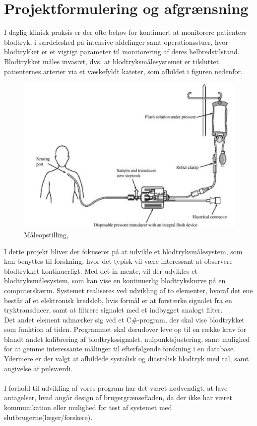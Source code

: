 \chapter{Projektformulering og afgrænsning}
I daglig klinisk praksis er der ofte behov for kontinuert at monitorere patienters blodtryk, i særdeleshed på intensive afdelinger samt operationsstuer, hvor blodtrykket er et vigtigt parameter til monitorering af deres helbredstilstand. \\
Blodtrykket måles invasivt, dvs. at blodtryksmålesystemet er tilsluttet patienternes arterier via et væskefyldt kateter, som afbildet i figuren nedenfor.
\begin{figure}[H]
	\centering
	\includegraphics[width=1\textwidth]{Figurer/Snip20151207_50}
	\caption{Måleopstilling, \protect\cite[s. 296]{Billed for invasiv blodtryksmaling}}
\end{figure}

I dette projekt bliver der fokuseret på at udvikle et blodtryksmålesystem, som kan benyttes til forskning, hvor det typisk vil være interessant at observere blodtrykket kontinuerligt. 
Med det in mente, vil der udvikles et blodtryksmålesystem, som kan vise en kontinuerlig blodtrykskurve på en computerskærm.
Systemet realiseres ved udvikling af to elementer, hvoraf det ene består af et elektronisk kredsløb, hvis formål er at forstærke signalet fra en tryktransducer, samt at filtrere signalet med et indbygget analogt filter.\\
Det andet element udmærker sig ved et C\#-program, der skal vise blodtrykket som funktion af tiden. Programmet skal derudover leve op til en række krav for blandt andet kalibrering af blodtrykssignalet, nulpunktsjustering, samt mulighed for at gemme interessante målinger til efterfølgende forskning i en database.
Ydermere er der valgt at afbildede systolisk og diastolisk blodtryk med tal, samt angivelse af pulsværdi.\\\\
I forhold til udvikling af vores program har det været nødvendigt, at lave antagelser, hvad angår design af brugergrænsefladen, da der ikke har været kommunikation eller mulighed for test af systemet med slutbrugerne(læger/forskere). 

